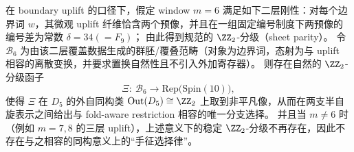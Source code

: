 \begin{conjecture}\label{conj:xi-window6-sheet-parity-functor-spin10-branching}
在 boundary uplift 的口径下，假定 window \(m=6\) 满足如下二层刚性：对每个边界词 \(w\)，其微观 uplift 纤维恰含两个预像，并且在一组固定编号制度下两预像的编号差为常数
\(\delta=34(=F_9)\)；
由此得到规范的 \(\ZZ_2\)-分级（sheet parity）。
令 \(\mathcal B_6\) 为由该二层覆盖数据生成的群胚/覆叠范畴（对象为边界词，态射为与 uplift 相容的离散变换，并要求置换自然性且不引入外加寄存器）。
则存在自然的 \(\ZZ_2\)-分级函子
\[
\Xi:\ \mathcal B_6\longrightarrow \mathrm{Rep}\!\bigl(\mathrm{Spin}(10)\bigr),
\]
使得 \(\Xi\) 在 \(D_5\) 的外自同构类 \(\mathrm{Out}(D_5)\cong\ZZ_2\) 上取到非平凡像，从而在两支半自旋表示之间给出与 fold-aware restriction 相容的唯一分支选择。
并且当 \(m\neq 6\) 时（例如 \(m=7,8\) 的三层 uplift），上述意义下的稳定 \(\ZZ_2\)-分级不再存在，因此不存在与之相容的同构意义上的“手征选择律”。
\end{conjecture}

